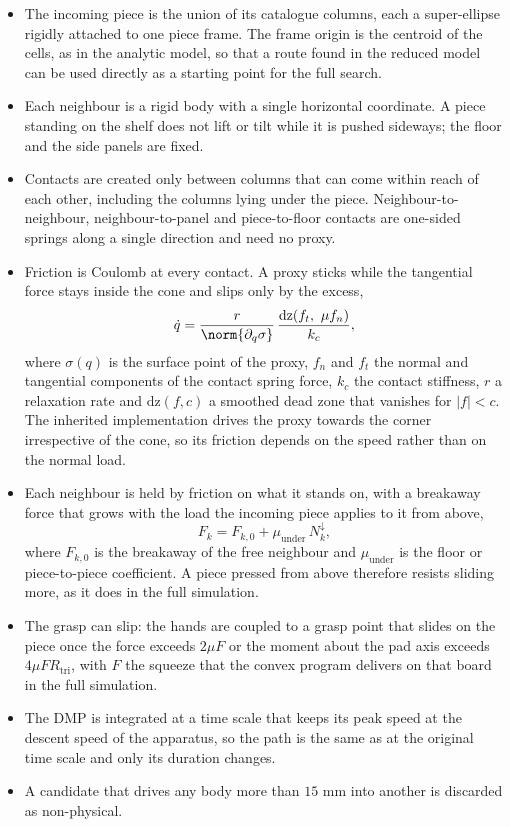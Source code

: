 \begin{itemize}
\item The incoming piece is the union of its catalogue columns, each a super-ellipse rigidly attached to one piece frame. The frame origin is the centroid of the cells, as in the analytic model, so that a route found in the reduced model can be used directly as a starting point for the full search.
\item Each neighbour is a rigid body with a single horizontal coordinate. A piece standing on the shelf does not lift or tilt while it is pushed sideways; the floor and the side panels are fixed.
\item Contacts are created only between columns that can come within reach of each other, including the columns lying under the piece. Neighbour-to-neighbour, neighbour-to-panel and piece-to-floor contacts are one-sided springs along a single direction and need no proxy.
\item Friction is Coulomb at every contact. A proxy sticks while the tangential force stays inside the cone and slips only by the excess,
\begin{equation}
\dot q=\frac{r}{\norm{\partial_q\sigma}}\,\frac{\mathrm{dz}\!\left(f_t,\ \mu f_n\right)}{k_c},
\end{equation}
where $\sigma(q)$ is the surface point of the proxy, $f_n$ and $f_t$ the normal and tangential components of the contact spring force, $k_c$ the contact stiffness, $r$ a relaxation rate and $\mathrm{dz}(f,c)$ a smoothed dead zone that vanishes for $\lvert f\rvert<c$. The inherited implementation drives the proxy towards the corner irrespective of the cone, so its friction depends on the speed rather than on the normal load.
\item Each neighbour is held by friction on what it stands on, with a breakaway force that grows with the load the incoming piece applies to it from above,
\begin{equation}
F_k=F_{k,0}+\mu_{\mathrm{under}}\,N_k^{\downarrow},
\end{equation}
where $F_{k,0}$ is the breakaway of the free neighbour and $\mu_{\mathrm{under}}$ is the floor or piece-to-piece coefficient. A piece pressed from above therefore resists sliding more, as it does in the full simulation.
\item The grasp can slip: the hands are coupled to a grasp point that slides on the piece once the force exceeds $2\mu F$ or the moment about the pad axis exceeds $4\mu F R_{\mathrm{tri}}$, with $F$ the squeeze that the convex program delivers on that board in the full simulation.
\item The DMP is integrated at a time scale that keeps its peak speed at the descent speed of the apparatus, so the path is the same as at the original time scale and only its duration changes.
\item A candidate that drives any body more than $15$ mm into another is discarded as non-physical.
\end{itemize}

